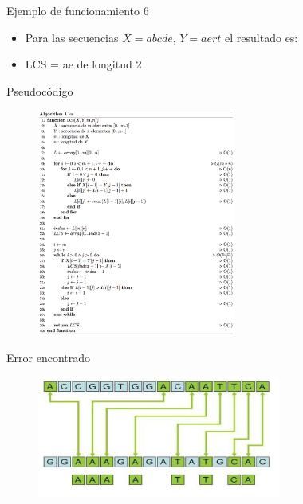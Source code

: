 \documentclass{beamer}
\begin{document}
				\begin{frame}{Ejemplo de funcionamiento 6}
 			
					\begin{itemize}
			
						\item  Para las secuencias $ X = abcde$, $ Y = aert$ el resultado es:
						\item LCS = ae de longitud 2
  					
					\end{itemize}	
					
				\end{frame}	

				\begin{frame}{Pseudocódigo}
 			
					\begin{figure}
						\includegraphics[height=7.5cm]{../res/pseudo_code.png}
					\caption{}
										
					\end{figure}
				\end{frame}
				
				\begin{frame}{Error encontrado}
 			
					\begin{figure}
						\includegraphics[width=8cm]{../res/imagen.png}
					\caption{}
										
					\end{figure}
				\end{frame}
				
\end{document}
